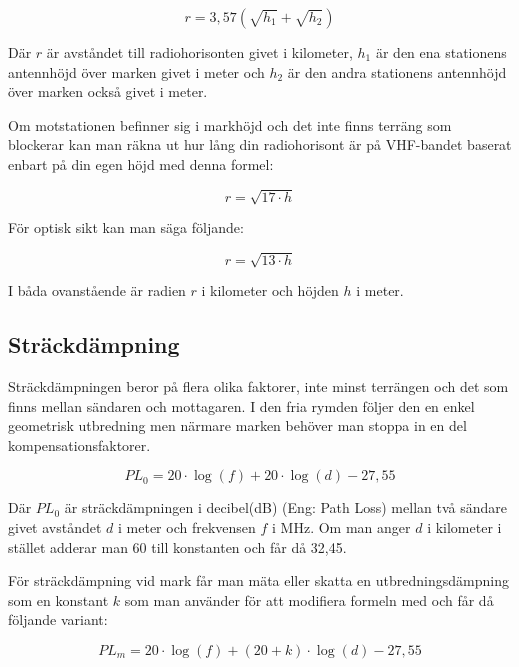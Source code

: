 \begin{equation}
	r = 3,57 \left(\sqrt{h_1}+\sqrt{h_2}\right)
\end{equation}

Där $r$ är avståndet till radiohorisonten givet i kilometer, $h_1$ är den ena
stationens antennhöjd över marken givet i meter och $h_2$ är den andra
stationens antennhöjd över marken också givet i meter.

Om motstationen befinner sig i markhöjd och det inte finns terräng som
blockerar kan man räkna ut hur lång din radiohorisont är på VHF-bandet baserat
enbart på din egen höjd med denna formel:

\begin{equation}
	r = \sqrt{17 \cdot h}
\end{equation}

För optisk sikt kan man säga följande:

\begin{equation}
	r = \sqrt{13 \cdot h}
\end{equation}

I båda ovanstående är radien $r$ i kilometer och höjden $h$ i meter.

\subsection{Sträckdämpning}

Sträckdämpningen beror på flera olika faktorer, inte minst terrängen och det
som finns mellan sändaren och mottagaren. I den fria rymden följer den en
enkel geometrisk utbredning men närmare marken behöver man stoppa in en del
kompensationsfaktorer.

\begin{equation}
	PL_0 = 20 \cdot \log(f) + 20 \cdot \log(d) - 27,55
\end{equation}

Där $PL_{0}$ är sträckdämpningen i decibel(dB) (Eng: Path Loss) mellan två
sändare givet avståndet $d$ i meter och frekvensen $f$ i MHz. Om man anger $d$
i kilometer i stället adderar man 60 till konstanten och får då 32,45.

För sträckdämpning vid mark får man mäta eller skatta en utbredningsdämpning
som en konstant $k$ som man använder för att modifiera formeln med och får då
följande variant:


\begin{equation}
	PL_m = 20 \cdot \log(f) + (20+k) \cdot \log(d) - 27,55
\end{equation}

